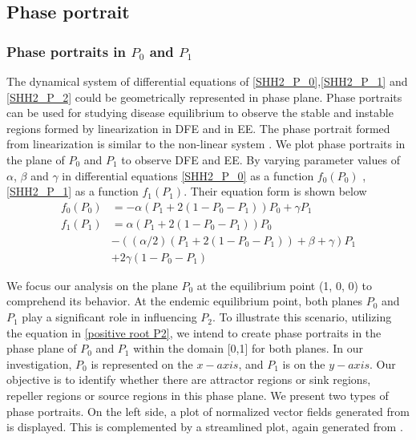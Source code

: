 \documentclass[paper=a4, fontsize=11pt, twoside, BCOR=12mm, parskip=full, listof=totoc]{scrreprt}
\begin{document}
{\subsection*{Phase portrait}	
\subsubsection*{Phase portraits in $P_0$ and $P_1$} 
The dynamical system of differential equations of \ref{SHH2_P_0},\ref{SHH2_P_1} and \ref{SHH2_P_2} could be geometrically represented in phase plane\cite{Phaseportrait}. Phase portraits can be used for studying disease equilibrium to observe the stable and instable regions formed by linearization in DFE and in EE. The phase portrait formed from linearization is similar to the non-linear system \cite{mccann2013bifurcation}. We plot phase portraits in the plane of $P_{0}$ and $P_{1}$ to observe DFE and EE. By varying parameter values of $\alpha$, $\beta$ and $\gamma$ in differential equations \ref{SHH2_P_0} as a function $f_0(P_0)$ , \ref{SHH2_P_1} as a function $f_1(P_1)$. Their equation form is shown below\\
\begin{equation}
\label{two dimension}
\begin{aligned}
 f_0(P_0) &= -\alpha( P_1 + 2( 1 - P_0-P_1 )) P_0 + \gamma P_1 \\
 f_1(P_1) &=  \alpha( P_1 + 2( 1 - P_0 - P_1 )) P_0    \\
        &- ((\alpha/2)( P_1 + 2(1 - P_0 - P_1)) + \beta + \gamma ) P_1  \\
        &+ 2 \gamma ( 1 - P_0 - P_1)        
\end{aligned}
\end{equation}

We focus our analysis on the plane \(P_0\) at the equilibrium point (1, 0, 0) to comprehend its behavior. At the endemic equilibrium point, both planes \(P_0\) and \(P_1\) play a significant role in influencing \(P_2\). To illustrate this scenario, utilizing the equation in \ref{positive root P2}, we intend to create phase portraits in the phase plane of \(P_0\) and \(P_1\) within the domain [0,1] for both planes. In our investigation, \(P_0\) is represented on the \(x-axis\), and \(P_1\) is on the \(y-axis\). Our objective is to identify whether there are attractor regions or sink regions, repeller regions or source regions in this phase plane.
We present two types of phase portraits. On the left side, a plot of normalized vector fields generated from \cite{vectorfieldplot} is displayed. This is complemented by a streamlined plot, again generated from \cite{streamlineplot}.  

}
\end{document}
